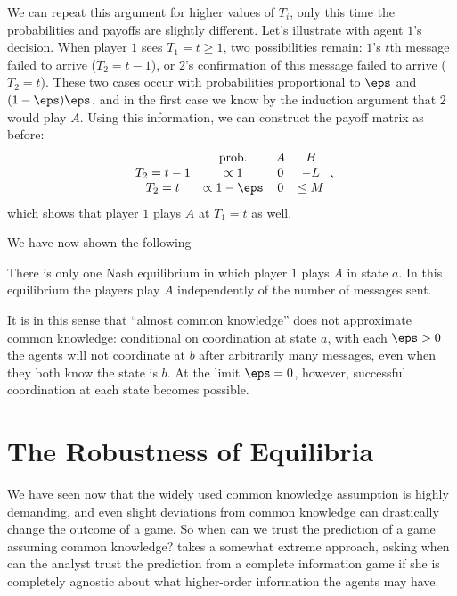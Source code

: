 We can repeat this argument for higher values of \(T_i\), only this time the probabilities and payoffs are slightly different.
Let's illustrate with agent \(1\)'s decision.
When player \(1\) sees \(T_1 = t \geq 1\), two possibilities remain: \(1\)'s \(t\)th message failed to arrive (\(T_2 = t - 1\)), or \(2\)'s confirmation of this message failed to arrive (\(T_2 = t\)).
These two cases occur with probabilities proportional to \(\eps\) and \((1 - \eps) \eps\), and in the first case we know by the induction argument that \(2\) would play \(A\).
Using this information, we can construct the payoff matrix as before:
\[
  \begin{array}{cc cc}
    & \text{prob.} & A & B \\
  T_2 = t - 1 & \propto 1 & 0 & -L \\
  T_2 = t & \propto 1 - \eps & 0 & \leq M
  \end{array},
\]
which shows that player \(1\) plays \(A\) at \(T_1 = t\) as well.

We have now shown the following
\begin{theorem}
  There is only one Nash equilibrium in which player \(1\) plays \(A\) in state \(a\).
  In this equilibrium the players play \(A\) independently of the number of messages sent.
\end{theorem}

It is in this sense that ``almost common knowledge'' does not approximate common knowledge: conditional on coordination at state \(a\), with each \(\eps > 0\) the agents will not coordinate at \(b\) after arbitrarily many messages, even when they both know the state is \(b\).
At the limit \(\eps = 0\), however, successful coordination at each state becomes possible.

\section{The Robustness of Equilibria}
We have seen now that the widely used common knowledge assumption is highly demanding, and even slight deviations from common knowledge can drastically change the outcome of a game.
So when can we trust the prediction of a game assuming common knowledge?
\Textcite{kajii1997RobustnessEquilibria} takes a somewhat extreme approach, asking when can the analyst trust the prediction from a complete information game if she is completely agnostic about what higher-order information the agents may have.

